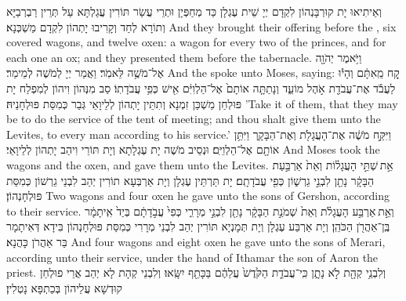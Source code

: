{וְאֵיתִיאוּ יָת קוּרְבָּנְהוֹן לִקְדָם יְיָ שֵׁית עֶגְלָן כַּד מְחַפְּיָן וּתְרֵי עֲשַׂר תּוֹרִין עֲגַלְתָּא עַל תְּרֵין רַבְרְבַיָּא וְתוֹרָא לְחַד וְקָרִיבוּ יָתְהוֹן לִקְדָם מַשְׁכְּנָא׃}
{And they brought their offering before the \lord, six covered wagons, and twelve oxen: a wagon for every two of the princes, and for each one an ox; and they presented them before the tabernacle.}{}
{וַיֹּ֥אמֶר יְהֹוָ֖ה אֶל־מֹשֶׁ֥ה לֵּאמֹֽר׃}
{וַאֲמַר יְיָ לְמֹשֶׁה לְמֵימַר׃}
{And the \lord\space spoke unto Moses, saying:}{}
{קַ֚ח מֵֽאִתָּ֔ם וְהָי֕וּ לַעֲבֹ֕ד אֶת־עֲבֹדַ֖ת אֹ֣הֶל מוֹעֵ֑ד וְנָתַתָּ֤ה אוֹתָם֙ אֶל־הַלְוִיִּ֔ם אִ֖ישׁ כְּפִ֥י עֲבֹדָתֽוֹ׃}
{סַב מִנְּהוֹן וִיהוֹן לְמִפְלַח יָת פּוּלְחַן מַשְׁכַּן זִמְנָא וְתִתֵּין יָתְהוֹן לְלֵיוָאֵי גְּבַר כְּמִסַּת פּוּלְחָנֵיהּ׃}
{’Take it of them, that they may be to do the service of the tent of meeting; and thou shalt give them unto the Levites, to every man according to his service.’}{}
{וַיִּקַּ֣ח מֹשֶׁ֔ה אֶת־הָעֲגָלֹ֖ת וְאֶת־הַבָּקָ֑ר וַיִּתֵּ֥ן אוֹתָ֖ם אֶל־הַלְוִיִּֽם׃}
{וּנְסֵיב מֹשֶׁה יָת עֶגְלָתָא וְיָת תּוֹרֵי וִיהַב יָתְהוֹן לְלֵיוָאֵי׃}
{And Moses took the wagons and the oxen, and gave them unto the Levites.}{}
{אֵ֣ת \legarmeh  שְׁתֵּ֣י הָעֲגָל֗וֹת וְאֵת֙ אַרְבַּ֣עַת הַבָּקָ֔ר נָתַ֖ן לִבְנֵ֣י גֵרְשׁ֑וֹן כְּפִ֖י עֲבֹדָתָֽם׃
}
{יָת תַּרְתֵּין עֶגְלָן וְיָת אַרְבְּעָא תוֹרִין יְהַב לִבְנֵי גֵרְשׁוֹן כְּמִסַּת פּוּלְחָנְהוֹן׃}
{Two wagons and four oxen he gave unto the sons of Gershon, according to their service.}{}
{וְאֵ֣ת \legarmeh  אַרְבַּ֣ע הָעֲגָלֹ֗ת וְאֵת֙ שְׁמֹנַ֣ת הַבָּקָ֔ר נָתַ֖ן לִבְנֵ֣י מְרָרִ֑י כְּפִי֙ עֲבֹ֣דָתָ֔ם בְּיַד֙ אִֽיתָמָ֔ר בֶּֽן־אַהֲרֹ֖ן הַכֹּהֵֽן׃}
{וְיָת אַרְבַּע עֶגְלָן וְיָת תְּמָנְיָא תּוֹרִין יְהַב לִבְנֵי מְרָרִי כְּמִסַּת פּוּלְחָנְהוֹן בִּידָא דְּאִיתָמָר בַּר אַהֲרֹן כָּהֲנָא׃}
{And four wagons and eight oxen he gave unto the sons of Merari, according unto their service, under the hand of Ithamar the son of Aaron the priest.}{}
{וְלִבְנֵ֥י קְהָ֖ת לֹ֣א נָתָ֑ן כִּֽי־עֲבֹדַ֤ת הַקֹּ֙דֶשׁ֙ עֲלֵהֶ֔ם בַּכָּתֵ֖ף יִשָּֽׂאוּ׃
}
{וְלִבְנֵי קְהָת לָא יְהַב אֲרֵי פוּלְחַן קוּדְשָׁא עֲלֵיהוֹן בְּכַתְפָּא נָטְלִין׃}
